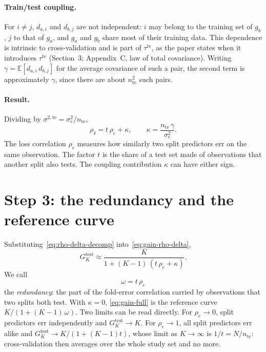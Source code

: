 \documentclass[11pt]{article}
\begin{document}
\paragraph{Train/test coupling.}
For $i \neq j$, $d_{a,i}$ and $d_{b,j}$ are not independent: $i$ may belong to the training set
of $g_b$, $j$ to that of $g_a$, and $g_a$ and $g_b$ share most of their training data. This
dependence is intrinsic to cross-validation and is part of $\tau^{\mathrm{te}}$, as the paper
states when it introduces $\tau^{\mathrm{te}}$ (Section~3; Appendix~C, law of total covariance). Writing
$\gamma = \mathbb{E}[d_{a,i}\, d_{b,j}]$ for the average covariance of such a pair, the second
term is approximately $\gamma$, since there are about $n_{\text{te}}^2$ such pairs.

\paragraph{Result.}
Dividing by $\sigma^{2,\mathrm{te}} = \sigma^2_e / n_{\text{te}}$,
\begin{equation}
  \boxed{\;
  \rho_\delta = t\,\rho_e + \kappa,
  \qquad
  \kappa = \frac{n_{\text{te}}\,\gamma}{\sigma^2_e}.
  \;}
  \label{eq:rho-delta-decomp}
\end{equation}
The loss correlation $\rho_e$ measures how similarly two split predictors err on the same
observation. The factor $t$ is the share of a test set made of observations that another split
also tests. The coupling contribution $\kappa$ can have either sign.

\section{Step 3: the redundancy and the reference curve}

Substituting~\eqref{eq:rho-delta-decomp} into~\eqref{eq:gain-rho-delta},
\begin{equation}
  G^{\text{test}}_K \approx \frac{K}{1 + (K-1)\,(t\,\rho_e + \kappa)}.
  \label{eq:gain-full}
\end{equation}
We call
\begin{equation}
  \omega = t\,\rho_e
  \label{eq:redundancy}
\end{equation}
the \emph{redundancy}: the part of the fold-error correlation carried by observations that two
splits both test. With $\kappa = 0$, \eqref{eq:gain-full} is the reference curve
$K/(1+(K-1)\,\omega)$. Two limits
can be read directly. For $\rho_e \to 0$, split predictors err independently and
$G^{\text{test}}_K \to K$. For $\rho_e \to 1$, all split predictors err alike and
$G^{\text{test}}_K \to K/(1+(K-1)t)$, whose limit as $K\to\infty$ is
$1/t = N/n_{\text{te}}$: cross-validation then averages over the whole study set and no more.
\end{document}
